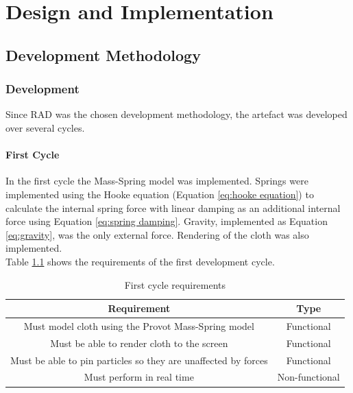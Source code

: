 \chapter{Design and Implementation}

\section{Development Methodology}

\subsection{Development}
Since RAD was the chosen development methodology, the artefact was developed over several cycles.

\subsubsection{First Cycle}
In the first cycle the Mass-Spring model was implemented. Springs were implemented using the Hooke equation (Equation \ref{eq:hooke equation}) to calculate the internal spring force with linear damping as an additional internal force using Equation \ref{eq:spring damping}. Gravity, implemented as Equation \ref{eq:gravity}, was the only external force. Rendering of the cloth was also implemented.
\\Table \ref{tab:cycle 1 require} shows the requirements of the first development cycle.
\begin{table}[tp]
   \begin{minipage}{\textwidth}
      \begin{center}
         \begin{tabular}{c|c}
           Requirement & Type\\
           \hline
           Must model cloth using the Provot Mass-Spring model & Functional\\
           Must be able to render cloth to the screen & Functional\\
           Must be able to pin particles so they are unaffected by forces & Functional\\
           Must perform in real time& Non-functional\\
         \end{tabular}
      \end{center}
   \end{minipage}
   \caption{First cycle requirements}
   \label{tab:cycle 1 require}
\end{table}
